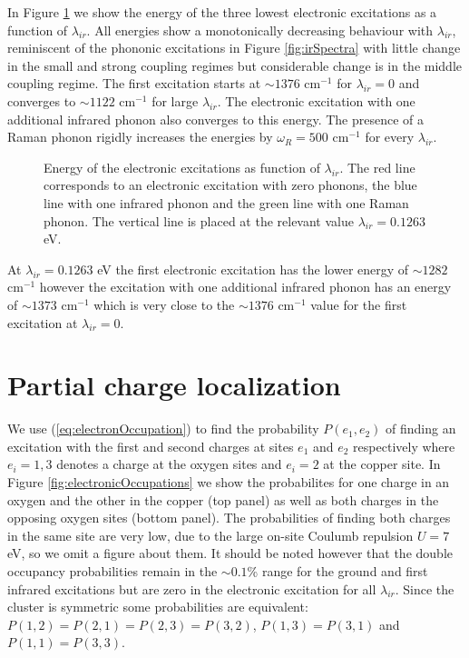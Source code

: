 In Figure \ref{fig:electrSpectra} we show the energy of the three lowest electronic excitations as a function of $\lambda_{ir}$.
All energies show a monotonically decreasing behaviour with $\lambda_{ir}$, reminiscent of the phononic excitations in Figure \ref{fig:irSpectra} with little change in the small and strong coupling regimes but considerable change is in the middle coupling regime.
The first excitation starts at $\sim 1376$ cm$^{-1}$ for $\lambda_{ir}=0$ and converges to $\sim 1122$ cm$^{-1}$ for large $\lambda_{ir}$.
The electronic excitation with one additional infrared phonon also converges to this energy.
The presence of a Raman phonon rigidly increases the energies by $\omega_R=500$ cm$^{-1}$ for every $\lambda_{ir}$.
%
\begin{figure}[ht]
  \centering
  
  \caption[Energy of the electronic excitations as function of $\lambda_{ir}$.]
  {Energy of the electronic excitations as function of $\lambda_{ir}$. 
    The red line corresponds to an electronic excitation with zero phonons, the blue line with one infrared phonon and the green line with one Raman phonon.
    The vertical line is placed at the relevant value $\lambda_{ir}=0.1263$ eV.}
  \label{fig:electrSpectra}
\end{figure}

At $\lambda_{ir}=0.1263$ eV the first electronic excitation has the lower energy of $\sim 1282$ cm$^{-1}$ however the excitation with one additional infrared phonon has an energy of $\sim 1373$ cm$^{-1}$ which is very close to the $\sim 1376$ cm$^{-1}$ value for the first excitation at $\lambda_{ir}=0$.

\section{Partial charge localization}

We use (\ref{eq:electronOccupation}) to find the probability $P(e_1,e_2)$ of finding an excitation with the first and second charges at sites $e_1$ and $e_2$ respectively where $e_i=1,3$ denotes a charge at the oxygen sites and $e_i=2$ at the copper site.
In Figure \ref{fig:electronicOccupations} we show the probabilites for one charge in an oxygen and the other in the copper (top panel) as well as both charges in the opposing oxygen sites (bottom panel).
The probabilities of finding both charges in the same site are very low, due to the large on-site Coulumb repulsion $U=7$ eV, so we omit a figure about them.
It should be noted however that the double occupancy probabilities remain in the $\sim 0.1$\% range for the ground and first infrared excitations but are zero in the electronic excitation for all $\lambda_{ir}$.
Since the cluster is symmetric some probabilities are equivalent: $P(1,2)=P(2,1)=P(2,3)=P(3,2)$, $P(1,3)=P(3,1)$ and $P(1,1)=P(3,3)$.

